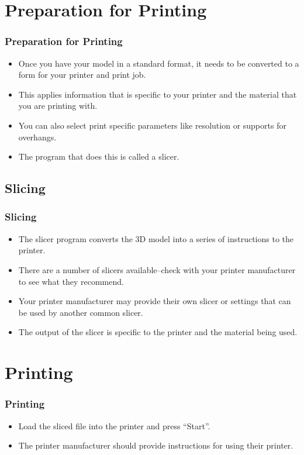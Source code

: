 \documentclass[english,10pt]{beamer}
\begin{document}
\section{Preparation for Printing}
\begin{frame}
  \frametitle{Preparation for Printing}
  \begin{itemize}
    \item Once you have your model in a standard format, it needs to be converted to a form for your printer and print job.
    \item This applies information that is specific to your printer and the material that you are printing with.
    \item You can also select print specific parameters like resolution or supports for overhangs.
    \item The program that does this is called a slicer.
  \end{itemize}
\end{frame}

\subsection{Slicing}
\begin{frame}
  \frametitle{Slicing}
  \begin{itemize}
    \item The slicer program converts the 3D model into a series of instructions to the printer.
    \item There are a number of slicers available--check with your printer manufacturer to see what they recommend.
    \item Your printer manufacturer may provide their own slicer or settings that can be used by another common slicer.
    \item The output of the slicer is specific to the printer and the material being used.
  \end{itemize}
\end{frame}

\section{Printing}
\begin{frame}
  \frametitle{Printing}
  \begin{itemize}
    \item Load the sliced file into the printer and press ``Start''.
    \item The printer manufacturer should provide instructions for using their printer.
  \end{itemize}
\end{frame}
\end{document}
